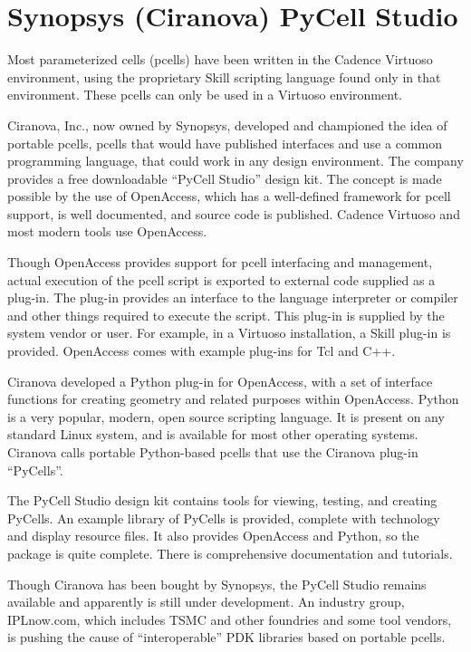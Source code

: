 \section{Synopsys (Ciranova) PyCell Studio}
\label{ciranova}
 
Most parameterized cells (pcells) have been written in the Cadence
Virtuoso environment, using the proprietary Skill scripting language
found only in that environment.  These pcells can only be used in a
Virtuoso environment.

Ciranova, Inc., now owned by Synopsys, developed and championed the
idea of portable pcells, pcells that would have published interfaces
and use a common programming language, that could work in any design
environment.  The company provides a free downloadable ``PyCell
Studio'' design kit.  The concept is made possible by the use of
OpenAccess, which has a well-defined framework for pcell support, is
well documented, and source code is published.  Cadence Virtuoso and
most modern tools use OpenAccess.

Though OpenAccess provides support for pcell interfacing and
management, actual execution of the pcell script is exported to
external code supplied as a plug-in.  The plug-in provides an
interface to the language interpreter or compiler and other things
required to execute the script.  This plug-in is supplied by the
system vendor or user.  For example, in a Virtuoso installation, a
Skill plug-in is provided.  OpenAccess comes with example plug-ins for
Tcl and C++.

Ciranova developed a Python plug-in for OpenAccess, with a set of
interface functions for creating geometry and related purposes within
OpenAccess.  Python is a very popular, modern, open source scripting
language.  It is present on any standard Linux system, and is
available for most other operating systems.  Ciranova calls portable
Python-based pcells that use the Ciranova plug-in ``PyCells''.

The PyCell Studio design kit contains tools for viewing, testing, and
creating PyCells.  An example library of PyCells is provided, complete
with technology and display resource files.  It also provides
OpenAccess and Python, so the package is quite complete.  There is
comprehensive documentation and tutorials.

Though Ciranova has been bought by Synopsys, the PyCell Studio remains
available and apparently is still under development.  An industry
group, IPLnow.com, which includes TSMC and other foundries and some
tool vendors, is pushing the cause of ``interoperable'' PDK libraries
based on portable pcells.

